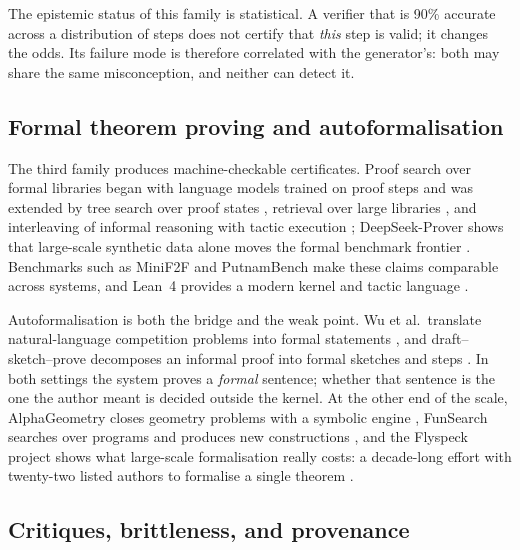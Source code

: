 \documentclass[11pt]{article}
\theoremstyle{plain}
\theoremstyle{definition}
\newcommand{\Lean}{\textsf{Lean}}
\begin{document}
The epistemic status of this family is statistical. A verifier that is 90\% accurate across
a distribution of steps does not certify that \emph{this} step is valid; it changes the
odds. Its failure mode is therefore correlated with the generator's: both may share the
same misconception, and neither can detect it.

\subsection{Formal theorem proving and autoformalisation}

The third family produces machine-checkable certificates. Proof search over formal
libraries began with language models trained on proof steps \citep{polu2020gptf} and was
extended by tree search over proof states \citep{lample2022hypertree}, retrieval over large
libraries \citep{yang2023leandojo}, and interleaving of informal reasoning with tactic
execution \citep{lin2024leanstar}; DeepSeek-Prover shows that large-scale synthetic data
alone moves the formal benchmark frontier \citep{xin2024deepseekprover}. Benchmarks such as
MiniF2F \citep{zheng2021minif2f} and PutnamBench \citep{tsoukalas2024putnambench} make
these claims comparable across systems, and \Lean{}~4 provides a modern kernel and tactic
language \citep{demoura2021lean4}.

Autoformalisation is both the bridge and the weak point. Wu et al.\ translate
natural-language competition problems into formal statements \citep{wu2022autoformalization},
and draft--sketch--prove decomposes an informal proof into formal sketches and steps
\citep{jiang2023draft}. In both settings the system proves a \emph{formal} sentence; whether
that sentence is the one the author meant is decided outside the kernel. At the other end of
the scale, AlphaGeometry closes geometry problems with a symbolic engine
\citep{trinh2024alphageometry}, FunSearch searches over programs and produces new
constructions \citep{romera2024funsearch}, and the Flyspeck project shows what large-scale
formalisation really costs: a decade-long effort with twenty-two listed authors to formalise
a single theorem \citep{hales2017kepler}.

\subsection{Critiques, brittleness, and provenance}
\end{document}
